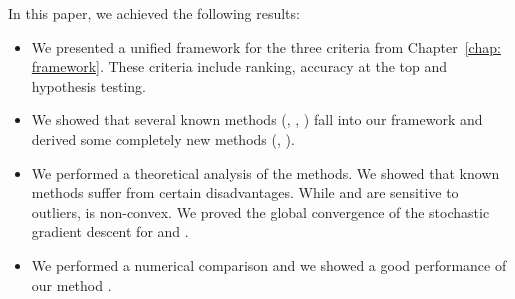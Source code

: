 In this paper, we achieved the following results:
\begin{itemize}
  \item We presented a unified framework for the three criteria from Chapter~\ref{chap: framework}. These criteria include ranking, accuracy at the top and hypothesis testing.
  \item We showed that several known methods (\TopPush, \Grill, \tauFPL) fall into our framework and derived some completely new methods (\PatMat, \PatMatNP).
  \item We performed a theoretical analysis of the methods. We showed that known methods suffer from certain disadvantages. While \TopPush and \tauFPL are sensitive to outliers, \Grill is non-convex. We proved the global convergence of the stochastic gradient descent for \PatMat and \PatMatNP.
  \item We performed a numerical comparison and we showed a good performance of our method \PatMatNP.
\end{itemize}
